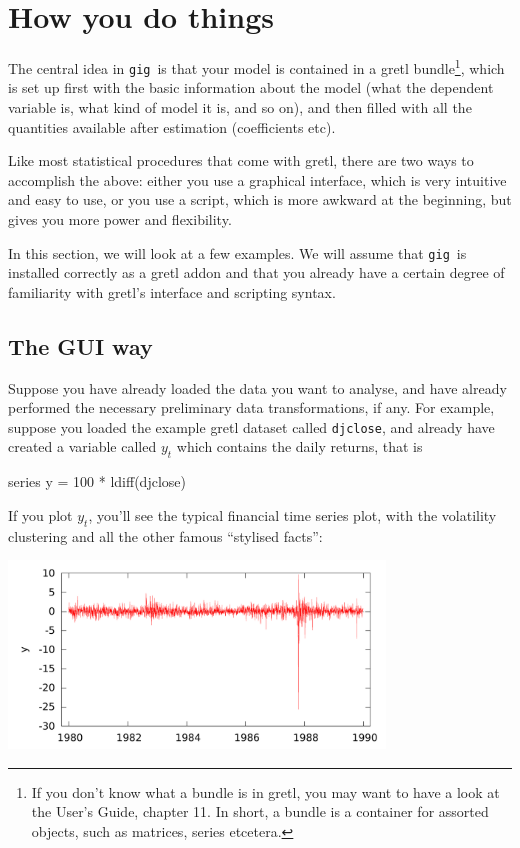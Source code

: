 \documentclass[a4paper,11pt]{article}
\newcommand{\app}[1]{\textsf{#1}}
\newcounter{script}[section]
\newcommand{\gig}{\texttt{gig}}
\begin{document}
\section{How you do things}

The central idea in \gig\ is that your model is contained in a
\app{gretl} bundle\footnote{If you don't know what a bundle is in
  \app{gretl}, you may want to have a look at the User's Guide,
  chapter 11. In short, a bundle is a container for assorted objects,
  such as matrices, series etcetera.}, which is set up first with the
basic information about the model (what the dependent variable is,
what kind of model it is, and so on), and then filled with all the
quantities available after estimation (coefficients etc).

Like most statistical procedures that come with \app{gretl}, there are
two ways to accomplish the above: either you use a graphical
interface, which is very intuitive and easy to use, or you use a
script, which is more awkward at the beginning, but gives you more
power and flexibility.

In this section, we will look at a few examples. We will assume that
\gig\ is installed correctly as a \app{gretl} addon and that you
already have a certain degree of familiarity with \app{gretl}'s
interface and scripting syntax.


\subsection{The GUI way}
\label{sec:GUI}

Suppose you have already loaded the data you want to analyse, and have
already performed the necessary preliminary data transformations, if
any. For example, suppose you loaded the example \app{gretl} dataset
called \texttt{djclose}, and already have created a variable called
$y_t$ which contains the daily returns, that is 
\begin{code}
  series y = 100 * ldiff(djclose)
\end{code}
If you plot $y_t$, you'll see the typical financial time series plot,
with the volatility clustering and all the other famous ``stylised
facts'':
\begin{center}
  \includegraphics[width=0.75\textwidth,height=0.35\textwidth]{graphs/djret}
\end{center}
\end{document}
